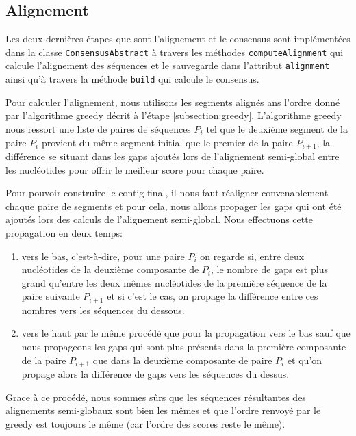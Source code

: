 
\subsection{Alignement}
\label{subsection:alignment}

Les deux dernières étapes que sont l'alignement et le consensus sont
implémentées dans la classe \verb|ConsensusAbstract| à travers les méthodes
\verb|computeAlignment| qui calcule l'alignement des séquences et le sauvegarde
dans l'attribut \verb|alignment| ainsi qu'à travers la méthode \verb|build|
qui calcule le consensus.

Pour calculer l'alignement, nous utilisons les segments alignés ans l'ordre
donné par l'algorithme greedy décrit à l'étape \ref{subsection:greedy}.
L'algorithme greedy nous ressort une liste de paires de séquences $P_{i}$ tel
que le deuxième segment de la paire $P_{i}$ provient du même segment initial que
le premier de la paire $P_{i + 1}$, la différence se situant dans les gaps
ajoutés lors de l'alignement semi-global entre les nucléotides pour offrir le
meilleur score pour chaque paire.

Pour pouvoir construire le contig final, il nous faut réaligner convenablement
chaque paire de segments et pour cela, nous allons propager les gaps qui ont été
ajoutés lors des calculs de l'alignement semi-global. Nous effectuons cette
propagation en deux temps:

\begin{enumerate}
	\item vers le bas, c'est-à-dire, pour une paire $P_{i}$ on regarde si, entre
		deux nucléotides de la deuxième composante de $P_{i}$, le
		nombre de gaps est plus grand qu'entre les deux mêmes nucléotides de la première
		séquence de la paire suivante $P_{i + 1}$ et si c'est le cas, on propage la
		différence entre ces nombres vers les séquences du dessous.
	\item vers le haut par le même procédé que pour la propagation vers le bas
		sauf que nous propageons les gaps qui sont plus présents dans la
		première composante de la paire $P_{i + 1}$ que dans la deuxième
		composante de paire $P_{i}$ et qu'on propage alors la différence de gaps
		vers les séquences du dessus.
\end{enumerate}

Grace à ce procédé, nous sommes sûrs que les séquences résultantes des
alignements semi-globaux sont bien les mêmes et que l'ordre renvoyé par le greedy
est toujours le même (car l'ordre des scores reste le même).

